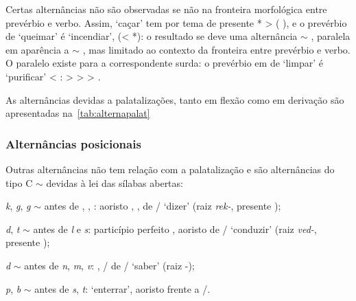 Certas alternâncias não são observadas se não na fronteira morfológica entre
prevérbio e verbo.
Assim,  `caçar' tem por tema de
presente * >  (
), e o prevérbio  de
 `queimar' é
 `incendiar', 
 (< *): o resultado se
deve uma alternância  $\sim$ , paralela em aparência a
 $\sim$ , mas limitado ao contexto da fronteira entre
prevérbio e verbo.
O paralelo existe para a correspondente surda: o prevérbio em  de
 `limpar' é
 `purificar' < :
 >  >  > .

As alternâncias devidas a palatalizações, tanto em flexão como em derivação são
apresentadas na~\autoref{tab:alternapalat}



\subsubsection{Alternâncias posicionais}

Outras alternâncias não tem relação com a palatalização e são alternâncias do
tipo C $\sim$ \emptyfon{} devidas à lei das sílabas abertas:

\begin{compactitem}[--]
	\item \emph{k}, \emph{g}, \emph{g} $\sim$ \emptyfon{} antes de ,
	, : aoristo 
	, 
	, 
	 de \slash{}
	`dizer' (raiz \emph{rek-}, presente 
	);
	\item \emph{d}, \emph{t} $\sim$ \emptyfon{} antes de \emph{l} e \emph{s}:
	particípio perfeito , aoristo 
	 de \slash{}
	`conduzir' (raiz \emph{ved-}, presente 
	);
	\item \emph{d} $\sim$ \emptyfon{} antes de \emph{n}, \emph{m}, \emph{v}:
	 , 
	/ de \slash{} `saber'
	(raiz -);
	\item \emph{p}, \emph{b} $\sim$ \emptyfon{} antes de \emph{s}, \emph{t}:
	  `enterrar', aoristo
	  frente a 
	\slash{}.
\end{compactitem}

